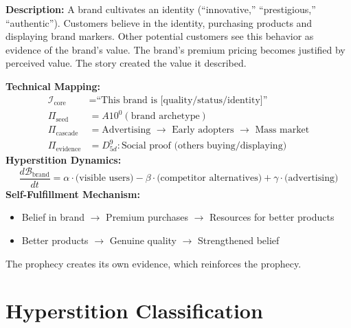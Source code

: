 \begin{tcolorbox}[colback=yellow!5!white,colframe=yellow!65!black,title=\textbf{Scenario 4: Brand Loyalty (Commercial Hyperstition)},breakable]

\textbf{Description:}
A brand cultivates an identity (``innovative,'' ``prestigious,'' ``authentic''). Customers believe in the identity, purchasing products and displaying brand markers. Other potential customers see this behavior as evidence of the brand's value. The brand's premium pricing becomes justified by perceived value. The story created the value it described.

\textbf{Technical Mapping:}
\begin{align*}
\mathcal{I}_{\text{core}} &= \text{``This brand is [quality/status/identity]''} \\
\Pi_{\text{seed}} &= A10^0(\text{brand archetype}) \\
\Pi_{\text{cascade}} &= \text{Advertising } \to \text{ Early adopters } \to \text{ Mass market} \\
\Pi_{\text{evidence}} &= D^9_{5d} : \text{Social proof (others buying/displaying)}
\end{align*}
\textbf{Hyperstition Dynamics:}
\[
\frac{d\mathcal{B}_{\text{brand}}}{dt} = \alpha \cdot \text{(visible users)} - \beta \cdot \text{(competitor alternatives)} + \gamma \cdot \text{(advertising)}
\]
\textbf{Self-Fulfillment Mechanism:}
\begin{itemize}
    \item Belief in brand $\to$ Premium purchases $\to$ Resources for better products
    \item Better products $\to$ Genuine quality $\to$ Strengthened belief
\end{itemize}
The prophecy creates its own evidence, which reinforces the prophecy.

\end{tcolorbox}

\section{Hyperstition Classification}
\label{sec:classification}

